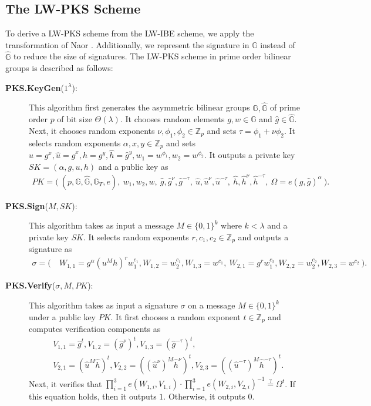 \documentclass[11pt,letterpaper]{article}
\newcommand{\G}{\mathbb{G}}
\newcommand{\Z}{\mathbb{Z}}
\newcommand{\bits}{\{0,1\}}
\begin{document}
\subsection{The LW-PKS Scheme}

To derive a LW-PKS scheme from the LW-IBE scheme, we apply the transformation
of Naor \cite{BonehF01}. Additionally, we represent the signature in $\G$
instead of $\hat{\G}$ to reduce the size of signatures. The LW-PKS scheme in
prime order bilinear groups is described as follows:

\begin{description}
\item [\textbf{PKS.KeyGen}($1^\lambda$):] This algorithm first generates
    the asymmetric bilinear groups $\G, \hat{\G}$ of prime order $p$ of bit
    size $\Theta(\lambda)$. It chooses random elements $g, w \in \G$ and
    $\hat{g} \in \hat{\G}$. Next, it chooses random exponents $\nu, \phi_1,
    \phi_2 \in \Z_p$ and sets $\tau = \phi_1 + \nu \phi_2$. It selects
    random exponents $\alpha, x, y \in \Z_p$ and sets $u = g^x, \hat{u} =
    \hat{g}^x, h = g^y, \hat{h} = \hat{g}^y, w_1 = w^{\phi_1}, w_2 =
    w^{\phi_2}$. It outputs a private key $SK = ( \alpha, g, u, h )$ and a
    public key as
    \begin{align*}
    PK = \Big(~ (p, \G, \hat{\G}, \G_T, e),~
        w_1, w_2, w,~
        \hat{g}, \hat{g}^{\nu}, \hat{g}^{-\tau},~
        \hat{u}, \hat{u}^{\nu}, \hat{u}^{-\tau},~
        \hat{h}, \hat{h}^{\nu}, \hat{h}^{-\tau},~
        \Omega = e(g, \hat{g})^{\alpha}
    ~\Big).
    \end{align*}

\item [\textbf{PKS.Sign}($M, SK$):] This algorithm takes as input a message
    $M \in \bits^k$ where $k < \lambda$ and a private key $SK$. It selects
    random exponents $r, c_1, c_2 \in \Z_p$ and outputs a signature as
    \begin{align*}
    \sigma = \Big(~
    &   W_{1,1} = g^{\alpha} (u^M h)^r w_1^{c_1},
        W_{1,2} = w_2^{c_1},
        W_{1,3} = w^{c_1},~
        W_{2,1} = g^r w_1^{c_2},
        W_{2,2} = w_2^{c_2},
        W_{2,3} = w^{c_2}
    ~\Big).
    \end{align*}

\item [\textbf{PKS.Verify}($\sigma, M, PK$):] This algorithm takes as input
    a signature $\sigma$ on a message $M \in \bits^k$ under a public key
    $PK$. It first chooses a random exponent $t \in \Z_p$ and computes
    verification components as
    \begin{align*}
    &   V_{1,1} = \hat{g}^t,
        V_{1,2} = (\hat{g}^{\nu})^t,
        V_{1,3} = (\hat{g}^{-\tau})^t, \\
    &   V_{2,1} = (\hat{u}^M \hat{h})^t,
        V_{2,2} = ((\hat{u}^{\nu})^M \hat{h}^{\nu})^t,
        V_{2,3} = ((\hat{u}^{-\tau})^M \hat{h}^{-\tau})^t.
    \end{align*}
    Next, it verifies that $\prod_{i=1}^3 e(W_{1,i}, V_{1,i}) \cdot
    \prod_{i=1}^3 e(W_{2,i}, V_{2,i})^{-1} \stackrel{?}{=} \Omega^t$. If
    this equation holds, then it outputs $1$. Otherwise, it outputs $0$.
\end{description}
\end{document}
